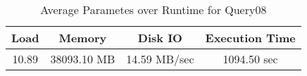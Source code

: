 \documentclass[../../main.tex]{subfiles}
\begin{document}
    \begin{table}
        \begin{center}
            \begin{tabular}{ |c|c|c|c| } 
            \hline
            Load & Memory & Disk IO & Execution Time\\
            \hline
            10.89 & 38093.10 MB & 14.59 MB/sec & 1094.50 sec \\
            \hline
            \end{tabular}
            \\[1pt]
            \caption{Average Parametes over Runtime for Query08}
        \end{center}
    \end{table}
    \pagebreak
\end{document}
